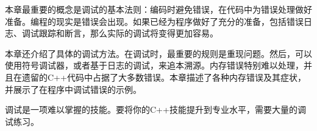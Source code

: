 本章最重要的概念是调试的基本法则：编码时避免错误，在代码中为错误处理做好准备。编程的现实是错误会出现。如果已经为程序做好了充分的准备，包括错误日志、调试跟踪和断言，那么实际的调试将变得更加容易。

本章还介绍了具体的调试方法。在调试时，最重要的规则是重现问题。然后，可以使用符号调试器，或者基于日志的调试，来追本溯源。内存错误特别难以处理，并且在遗留的C++代码中占据了大多数错误。本章描述了各种内存错误及其症状，并展示了在程序中调试错误的示例。

调试是一项难以掌握的技能。要将你的C++技能提升到专业水平，需要大量的调试练习。


